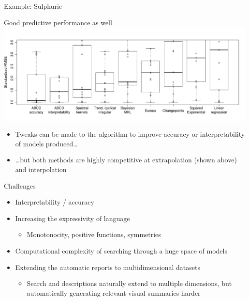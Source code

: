 \begin{frame}{Example: Sulphuric}
\end{frame}

\begin{frame}{Good predictive performance as well}
  \includegraphics[width=0.99\textwidth]{figures/box_extrap_wide}\\
  \begin{itemize}
    \item Tweaks can be made to the algorithm to improve accuracy or interpretability of models produced\ldots
    \vspace{\baselineskip}
    \item \ldots but both methods are highly competitive at extrapolation (shown above) and interpolation
  \end{itemize}
\end{frame}

\begin{frame}{Challenges}
  \begin{itemize}
    \item Interpretability / accuracy
    \vspace{\baselineskip}
    \item Increasing the expressivity of language
    \begin{itemize}
      \item \eg Monotonocity, positive functions, symmetries
    \end{itemize}
    \vspace{\baselineskip}
    \item Computational complexity of searching through a huge space of models
    \vspace{\baselineskip}
    \item Extending the automatic reports to multidimensional datasets
    \begin{itemize}
      \item Search and descriptions naturally extend to multiple dimensions, but automatically generating relevant visual summaries harder 
    \end{itemize}
  \end{itemize}
\end{frame}

